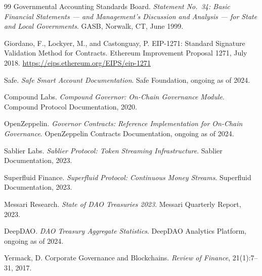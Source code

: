 \documentclass[11pt,a4paper]{article}
\theoremstyle{definition}
\theoremstyle{remark}
\begin{document}
\begin{thebibliography}{99}
Governmental Accounting Standards Board.
\newblock \emph{Statement No.~34: Basic Financial Statements ---
  and Management's Discussion and Analysis --- for State and
  Local Governments}.
\newblock GASB, Norwalk, CT, June 1999.

Giordano, F., Lockyer, M., and Castonguay, P.
\newblock EIP-1271: Standard Signature Validation Method for
  Contracts.
\newblock Ethereum Improvement Proposal 1271, July 2018.
\newblock \url{https://eips.ethereum.org/EIPS/eip-1271}

Safe.
\newblock \emph{Safe Smart Account Documentation}.
\newblock Safe Foundation, ongoing as of 2024.

Compound Labs.
\newblock \emph{Compound Governor: On-Chain Governance Module}.
\newblock Compound Protocol Documentation, 2020.

OpenZeppelin.
\newblock \emph{Governor Contracts: Reference Implementation for
  On-Chain Governance}.
\newblock OpenZeppelin Contracts Documentation, ongoing as of 2024.

Sablier Labs.
\newblock \emph{Sablier Protocol: Token Streaming Infrastructure}.
\newblock Sablier Documentation, 2023.

Superfluid Finance.
\newblock \emph{Superfluid Protocol: Continuous Money Streams}.
\newblock Superfluid Documentation, 2023.

Messari Research.
\newblock \emph{State of DAO Treasuries 2023}.
\newblock Messari Quarterly Report, 2023.

DeepDAO.
\newblock \emph{DAO Treasury Aggregate Statistics}.
\newblock DeepDAO Analytics Platform, ongoing as of 2024.

Yermack, D.
\newblock Corporate Governance and Blockchains.
\newblock \emph{Review of Finance}, 21(1):7--31, 2017.

\end{thebibliography}
\end{document}
